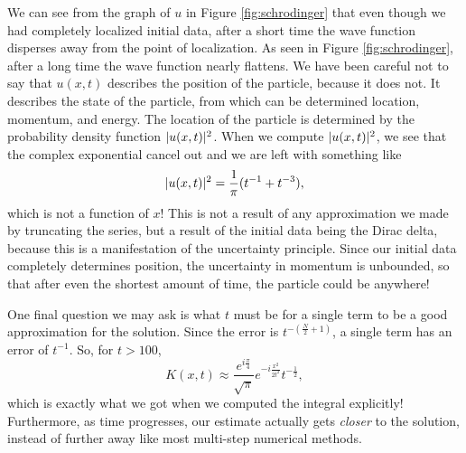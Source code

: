 We can see from the graph of $u$ in Figure \ref{fig:schrodinger} that even though we had completely localized initial data, after a short time the wave function disperses away from the point of localization. As seen in Figure \ref{fig:schrodinger}, after a long time the wave function nearly flattens.
We have been careful not to say that $u(x, t)$ describes the position of the particle, because it does not. It describes the state of the particle, from which can be determined location, momentum, and energy. The location of the particle is determined by the probability density function $\lvert u(x, t)\rvert^2$.
When we compute $\lvert u(x, t)\rvert^2$, we see that the complex exponential cancel out and we are left with something like
\[
\lvert u(x, t)\rvert^2 = \frac{1}{\pi}(t^{-1} + t^{-3}),
\]
which is not a function of $x$! This is not a result of any approximation we made by truncating the series, but a result of the initial data being the Dirac delta, because this is a manifestation of the uncertainty principle. Since our initial data completely determines position, the uncertainty in momentum is unbounded, so that after even the shortest amount of time, the particle could be anywhere!

One final question we may ask is what $t$ must be for a single term to be a good approximation for the solution. Since the error is $t^{-(\frac{N}{2}+1)}$, a single term has an error of $t^{-1}$. So, for $t > 100$, 
\begin{equation}
K(x, t) \approx \frac{e^{i\frac{\pi}{4}}}{\sqrt{\pi}}e^{-i\frac{x^2}{2t^2}}t^{-\frac{1}{2}},
\end{equation}
which is exactly what we got when we computed the integral explicitly! Furthermore, as time progresses, our estimate actually gets \textit{closer} to the solution, instead of further away like most multi-step numerical methods.